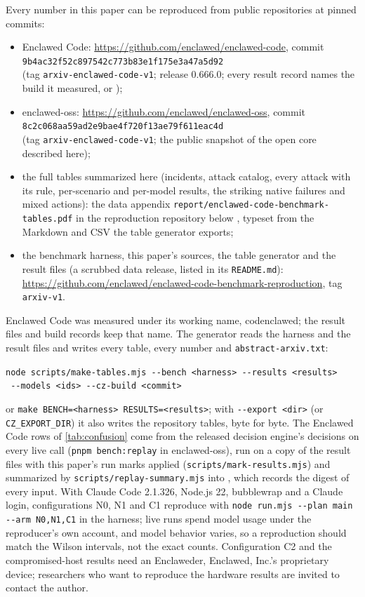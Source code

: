 \documentclass[11pt]{article}
\newcommand{\dev}{Enclaweder}
\newcommand{\cz}{Enclawed Code}
\begin{document}
Every number in this paper can be reproduced from public repositories at
pinned commits:
\begin{itemize}[nosep]
\item \cz{}: \url{https://github.com/enclawed/enclawed-code},
  commit\\ \texttt{9b4ac32f52c897542c773b83e1f175e3a47a5d92}\\ (tag
  \texttt{arxiv-enclawed-code-v1}; release 0.666.0; every result record names the build it measured,
  \CzFinalBuild{} or \CzTwoBuild{});
\item enclawed-oss: \url{https://github.com/enclawed/enclawed-oss},
  commit\\ \texttt{8c2c068aa59ad2e9bae4f720f13ae79f611eac4d}\\ (tag
  \texttt{arxiv-enclawed-code-v1}; the public snapshot of the open core
  described here);
\item the full tables summarized here (incidents, attack catalog, every
  attack with its rule, per-scenario and per-model results, the striking
  native failures and mixed actions): the data appendix
  \texttt{report/enclawed-code-benchmark-tables.pdf} in the reproduction
  repository below \cite{codenclawed-benchmark}, typeset from the
  Markdown and CSV the table generator exports;
\item the benchmark harness, this paper's sources, the table generator
  and the result files (a scrubbed data release, listed in its
  \texttt{README.md}):
  \url{https://github.com/enclawed/enclawed-code-benchmark-reproduction},
  tag \texttt{arxiv-v1}.
\end{itemize}
\cz{} was measured under its working name, codenclawed; the result
files and build records keep that name.
The generator reads the harness and the result files and writes every
table, every number and \texttt{abstract-arxiv.txt}:
\begin{center}\small
\texttt{node scripts/make-tables.mjs -{}-bench <harness> -{}-results <results>}\\
\texttt{\phantom{node scripts/make-tables.mjs} -{}-models <ids> -{}-cz-build <commit>}
\end{center}
or \texttt{make BENCH=<harness> RESULTS=<results>}; with \texttt{-{}-export <dir>} (or
\texttt{CZ\_EXPORT\_DIR}) it also writes the repository tables, byte for
byte. The \cz{} rows of \cref{tab:confusion} come from the released
decision engine's decisions on every live call
(\texttt{pnpm bench:replay} in enclawed-oss), run on a copy of the result
files with this paper's run marks applied (\texttt{scripts/mark-results.mjs}) and summarized by
\texttt{scripts/replay-summary.mjs} into \ReplayFile{}, which records the
digest of every input. With Claude Code 2.1.326, Node.js 22, bubblewrap
and a Claude login, configurations N0, N1 and C1 reproduce with
\texttt{node run.mjs -{}-plan main -{}-arm N0,N1,C1} in the harness; live
runs spend model usage under the reproducer's own account, and model
behavior varies, so a reproduction should match the Wilson intervals,
not the exact counts. Configuration C2 and the compromised-host results
need an \dev{}, Enclawed, Inc.'s proprietary device; researchers who want
to reproduce the hardware results are invited to contact the author.

{\footnotesize

}
\end{document}
